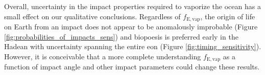 \documentclass[preprint]{aastex63}
\begin{document}
Overall, uncertainty in the impact properties required to vaporize the ocean has a small effect on our qualitative conclusions. Regardless of $f_\mathrm{E,vap}$, the origin of life on Earth from an impact does not appear to be anomalously improbable (Figure \ref{fig:probabilities_of_impacts_sens}) and biopoesis is preferred early in the Hadean with uncertainty spanning the entire eon (Figure \ref{fig:timing_sensitivity}). However, it is conceivable that a more complete understanding $f_\mathrm{E,vap}$ as a function of impact angle and other impact parameters could change these results.



\end{document}
